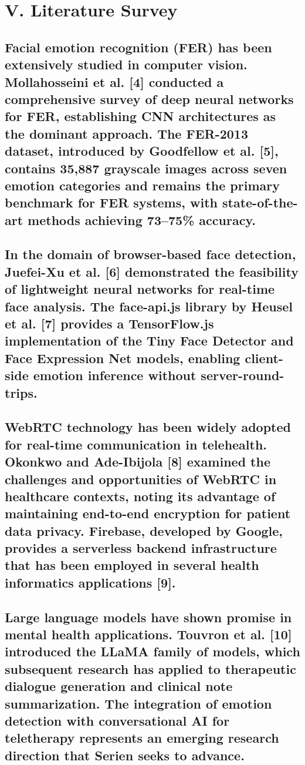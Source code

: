 \documentclass[conference]{IEEEtran}
\begin{document}
\section{V. Literature Survey}
\subsection{Facial emotion recognition (FER) has been extensively studied in computer vision. Mollahosseini et al. [4] conducted a comprehensive survey of deep neural networks for FER, establishing CNN architectures as the dominant approach. The FER-2013 dataset, introduced by Goodfellow et al. [5], contains 35,887 grayscale images across seven emotion categories and remains the primary benchmark for FER systems, with state-of-the-art methods achieving 73–75\% accuracy.}
\subsection{In the domain of browser-based face detection, Juefei-Xu et al. [6] demonstrated the feasibility of lightweight neural networks for real-time face analysis. The face-api.js library by Heusel et al. [7] provides a TensorFlow.js implementation of the Tiny Face Detector and Face Expression Net models, enabling client-side emotion inference without server-round-trips.}
\subsection{WebRTC technology has been widely adopted for real-time communication in telehealth. Okonkwo and Ade-Ibijola [8] examined the challenges and opportunities of WebRTC in healthcare contexts, noting its advantage of maintaining end-to-end encryption for patient data privacy. Firebase, developed by Google, provides a serverless backend infrastructure that has been employed in several health informatics applications [9].}
\subsection{Large language models have shown promise in mental health applications. Touvron et al. [10] introduced the LLaMA family of models, which subsequent research has applied to therapeutic dialogue generation and clinical note summarization. The integration of emotion detection with conversational AI for teletherapy represents an emerging research direction that Serien seeks to advance.}
\end{document}
